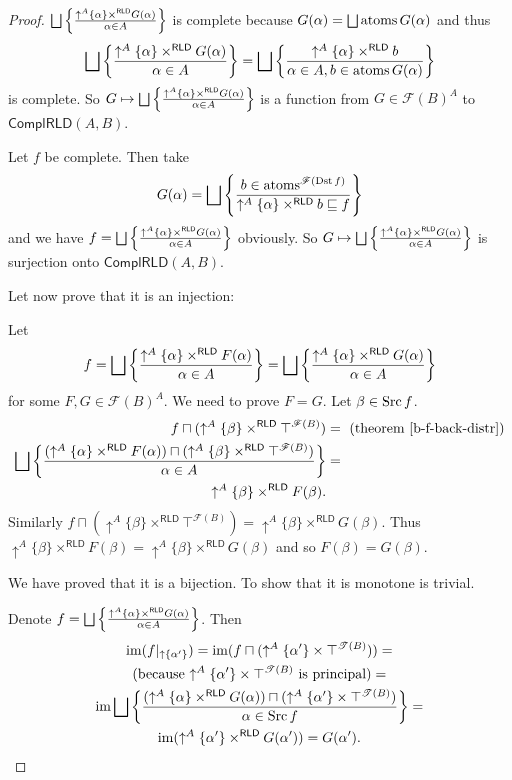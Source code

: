 \begin{proof}
$\bigsqcup\setcond{\uparrow^{A}\{\alpha\}\times^{\mathsf{RLD}}G(\alpha)}{\alpha\in A}$
is complete because $G(\alpha)=\bigsqcup\atoms G(\alpha)$ and thus
\[
\bigsqcup\setcond{\uparrow^{A}\{\alpha\}\times^{\mathsf{RLD}}G(\alpha)}{\alpha\in A}=\bigsqcup\setcond{\uparrow^{A}\{\alpha\}\times^{\mathsf{RLD}}b}{\alpha\in A,b\in\atoms G(\alpha)}
\]
is complete. So $G\mapsto\bigsqcup\setcond{\uparrow^{A}\{\alpha\}\times^{\mathsf{RLD}}G(\alpha)}{\alpha\in A}$
is a function from $G\in\mathscr{F}(B)^{A}$ to $\mathsf{ComplRLD}(A,B)$.

Let $f$ be complete. Then take
\[
G(\alpha)=\bigsqcup\setcond{b\in\atoms^{\mathscr{F}(\Dst f)}}{\uparrow^{A}\{\alpha\}\times^{\mathsf{RLD}}b\sqsubseteq f}
\]
and we have $f=\bigsqcup\setcond{\uparrow^{A}\{\alpha\}\times^{\mathsf{RLD}}G(\alpha)}{\alpha\in A}$
obviously. So $G\mapsto\bigsqcup\setcond{\uparrow^{A}\{\alpha\}\times^{\mathsf{RLD}}G(\alpha)}{\alpha\in A}$
is surjection onto $\mathsf{ComplRLD}(A,B)$.

Let now prove that it is an injection:

Let
\[
f=\bigsqcup\setcond{\uparrow^{A}\{\alpha\}\times^{\mathsf{RLD}}F(\alpha)}{\alpha\in A}=\bigsqcup\setcond{\uparrow^{A}\{\alpha\}\times^{\mathsf{RLD}}G(\alpha)}{\alpha\in A}
\]
for some $F,G\in\mathscr{F}(B)^{A}$. We need to prove $F=G$. Let
$\beta\in\operatorname{Src} f$.
\begin{align*}
f\sqcap(\uparrow^{A}\{\beta\}\times^{\mathsf{RLD}}\top^{\mathscr{F}(B)}) & =\text{ (theorem~\ref{b-f-back-distr})}\\
\bigsqcup\setcond{(\uparrow^{A}\{\alpha\}\times^{\mathsf{RLD}}F(\alpha))\sqcap(\uparrow^{A}\{\beta\}\times^{\mathsf{RLD}}\top^{\mathscr{F}(B)})}{\alpha\in A} & =\\
\uparrow^{A}\{\beta\}\times^{\mathsf{RLD}}F(\beta).
\end{align*}
Similarly $f\sqcap(\uparrow^{A}\{\beta\}\times^{\mathsf{RLD}}\top^{\mathscr{F}(B)})=\uparrow^{A}\{\beta\}\times^{\mathsf{RLD}}G(\beta)$.
Thus $\uparrow^{A}\{\beta\}\times^{\mathsf{RLD}}F(\beta)=\uparrow^{A}\{\beta\}\times^{\mathsf{RLD}}G(\beta)$
and so $F(\beta)=G(\beta)$.

We have proved that it is a bijection. To show that it is monotone
is trivial.

Denote $f=\bigsqcup\setcond{\uparrow^{A}\{\alpha\}\times^{\mathsf{RLD}}G(\alpha)}{\alpha\in A}$.
Then
\begin{multline*}
\im(f|_{\uparrow \{\alpha'\}})=\im(f\sqcap(\uparrow^{A}\{\alpha'\}\times\top^{\mathscr{T}(B)}))= \\
\text{(because \ensuremath{\uparrow^{A}\{\alpha'\}\times\top^{\mathscr{T}(B)}} is principal)}=\\
\im\bigsqcup\setcond{(\uparrow^{A}\{\alpha\}\times^{\mathsf{RLD}}G(\alpha))\sqcap(\uparrow^{A}\{\alpha'\}\times\top^{\mathscr{T}(B)})}{\alpha\in\Src f}=\\
\im(\uparrow^{A}\{\alpha'\}\times^{\mathsf{RLD}}G(\alpha'))=G(\alpha').
\end{multline*}
\end{proof}
